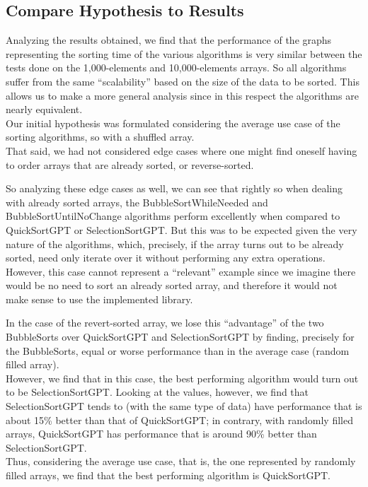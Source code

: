 \documentclass{article}
\begin{document}
    \subsection{Compare Hypothesis to Results}
    Analyzing the results obtained, we find that the performance of the graphs representing the sorting time of the various algorithms is very similar between the tests done on the 1,000-elements and 10,000-elements arrays. So all algorithms suffer from the same “scalability” based on the size of the data to be sorted. This allows us to make a more general analysis since in this respect the algorithms are nearly equivalent.\\
    
    Our initial hypothesis was formulated considering the average use case of the sorting algorithms, so with a shuffled array. \\

    That said, we had not considered edge cases where one might find oneself having to order arrays that are already sorted, or reverse-sorted.
    
    So analyzing these edge cases as well, we can see that rightly so when dealing with already sorted arrays, the BubbleSortWhileNeeded and BubbleSortUntilNoChange algorithms perform excellently when compared to QuickSortGPT or SelectionSortGPT. But this was to be expected given the very nature of the algorithms, which, precisely, if the array turns out to be already sorted, need only iterate over it without performing any extra operations. However, this case cannot represent a “relevant” example since we imagine there would be no need to sort an already sorted array, and therefore it would not make sense to use the implemented library.
    
    In the case of the revert-sorted array, we lose this “advantage” of the two BubbleSorts over QuickSortGPT and SelectionSortGPT by finding, precisely for the BubbleSorts, equal or worse performance than in the average case (random filled array). \\ 
    However, we find that in this case, the best performing algorithm would turn out to be SelectionSortGPT. Looking at the values, however, we find that SelectionSortGPT tends to (with the same type of data) have performance that is about 15\% better than that of QuickSortGPT; in contrary, with randomly filled arrays, QuickSortGPT has performance that is around 90\% better than SelectionSortGPT.\\

    Thus, considering the average use case, that is, the one represented by randomly filled arrays, we find that the best performing algorithm is QuickSortGPT.
    
\end{document}
